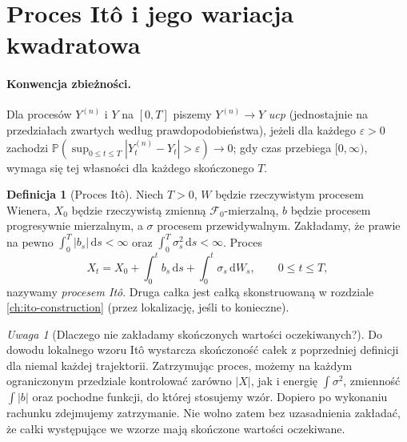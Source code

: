 \documentclass[11pt,a4paper,oneside]{report}
\numberwithin{equation}{chapter}
\theoremstyle{plain}
\theoremstyle{definition}
\newtheorem{definicja}{Definicja}[chapter]
\theoremstyle{remark}
\newtheorem{uwaga}{Uwaga}[chapter]
\newcommand{\Prob}{\mathbb{P}}
\newcommand{\calF}{\mathcal{F}}
\newcommand{\dd}{\mathrm{d}}
\begin{document}
\section{Proces Itô i jego wariacja kwadratowa}
\paragraph{Konwencja zbieżności.}
Dla procesów $Y^{(n)}$ i $Y$ na $[0,T]$ piszemy
$Y^{(n)}\to Y$ \emph{ucp} (jednostajnie na przedziałach
zwartych według prawdopodobieństwa), jeżeli dla każdego
$\varepsilon>0$ zachodzi
$\Prob(\sup_{0\le t\le T}|Y_t^{(n)}-Y_t|>\varepsilon)
\to0$; gdy czas przebiega $[0,\infty)$, wymaga się
tej własności dla każdego skończonego $T$.

\begin{definicja}[Proces Itô]
Niech $T>0$, $W$ będzie rzeczywistym procesem Wienera,
$X_0$ będzie rzeczywistą zmienną $\calF_0$-mierzalną,
$b$ będzie procesem progresywnie mierzalnym, a $\sigma$
procesem przewidywalnym. Zakładamy, że prawie na pewno
$\int_0^T|b_s|\,\dd s<\infty$ oraz
$\int_0^T\sigma_s^2\,\dd s<\infty$.
Proces
\[
X_t=X_0+\int_0^tb_s\,\dd s+\int_0^t\sigma_s\,\dd W_s,
\qquad 0\le t\le T,
\tag{3.1}\label{eq:ito-process}
\]
nazywamy \emph{procesem Itô}. Druga całka jest całką
skonstruowaną w rozdziale \ref{ch:ito-construction}
(przez lokalizację, jeśli to konieczne).
\end{definicja}

\begin{uwaga}[Dlaczego nie zakładamy skończonych wartości oczekiwanych?]
Do dowodu lokalnego wzoru Itô wystarcza skończoność całek
z poprzedniej definicji dla niemal każdej trajektorii.
Zatrzymując proces, możemy na każdym ograniczonym przedziale
kontrolować zarówno $|X|$, jak i energię $\int\sigma^2$,
zmienność $\int|b|$ oraz pochodne funkcji, do której
stosujemy wzór. Dopiero po wykonaniu rachunku zdejmujemy
zatrzymanie. Nie wolno zatem bez uzasadnienia zakładać, że
całki występujące we wzorze mają skończone wartości oczekiwane.
\end{uwaga}
\end{document}

